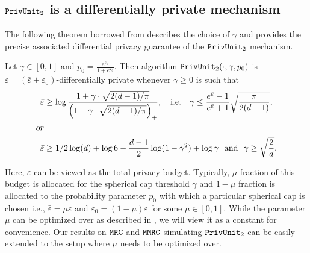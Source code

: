 \subsection{\texorpdfstring{$\texttt{PrivUnit}_2$}{PrivUnit} is a differentially private mechanism}
\label{subsubsec:privunit_dp}
The following theorem borrowed from \cite{BDFKR2018} describes the choice of $\gamma$ and provides the precise associated differential privacy guarantee of the $\texttt{PrivUnit}_2$ mechanism.
\begin{theorem}
  \label{thm:PrivUnitPriv}
  Let $\gamma \in [0,1]$ and $p_0 = \frac{e^{\varepsilon_0}}{1 +
    e^{\varepsilon_0}}$. Then algorithm \emph{$\texttt{PrivUnit}_2(\cdot, \gamma, p_0)$}
  is $\varepsilon = (\bar{\varepsilon}+\varepsilon_0)$-differentially private whenever $\gamma \ge 0$ is
  such that
  \begin{align}
  \begin{aligned}\label{eqn:sufficient-gamma}
      \bar{\varepsilon} & \ge
      \log\frac{ 1+\gamma \cdot \sqrt{ 2(d-1) / \pi } }{
        {\left( 1 - \gamma \cdot \sqrt{ 2(d-1) / \pi } \right)_+} },
      ~~~ \mbox{i.e.} ~~~
      \gamma \le \frac{e^{\bar{\varepsilon}} - 1}{e^{\bar{\varepsilon}} + 1} \sqrt{\frac{\pi}{2(d-1)}},\\
     or\\
       \bar{\varepsilon} & \ge 1/2 \log(d) + \log 6 - \frac{d - 1}{2}
       \log (1 - \gamma^2) + \log \gamma
       ~~ \mbox{and} ~~
       \gamma \ge \sqrt{\frac{2}{d}}.
  \end{aligned}
  \end{align}
\end{theorem}

Here, $\varepsilon$ can be viewed as the total privacy budget. Typically, $\mu$ fraction of this budget is allocated for the spherical cap threshold $\gamma$ and $1-\mu$ fraction is allocated to the probability parameter $p_0$ with which a particular spherical cap is chosen i.e., $\bar{\varepsilon} = \mu \varepsilon$ and $\varepsilon_0 = (1-\mu) \varepsilon$ for some $\mu \in [0,1]$. While the parameter $\mu$ can be optimized over as described in \cite{FT21}, we will view it as a constant for convenience. Our results on $\texttt{MRC}$ and $\texttt{MMRC}$ simulating $\texttt{PrivUnit}_2$ can be easily extended to the setup where $\mu$ needs to be optimized over.

